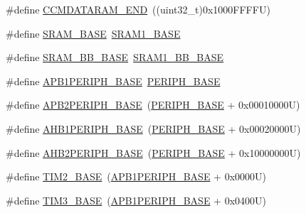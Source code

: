 \begin{DoxyCompactItemize}
\#define \hyperlink{group___peripheral__registers__structures_ga9fbe263946209e6f09faf93512bd2f9a}{C\+C\+M\+D\+A\+T\+A\+R\+A\+M\+\_\+\+E\+ND}~((uint32\+\_\+t)0x1000\+F\+F\+F\+F\+U)
\item 
\#define \hyperlink{group___peripheral__registers__structures_ga05e8f3d2e5868754a7cd88614955aecc}{S\+R\+A\+M\+\_\+\+B\+A\+SE}~\hyperlink{group___peripheral__memory__map_ga7d0fbfb8894012dbbb96754b95e562cd}{S\+R\+A\+M1\+\_\+\+B\+A\+SE}
\item 
\#define \hyperlink{group___peripheral__registers__structures_gad3548b6e2f017f39d399358f3ac98454}{S\+R\+A\+M\+\_\+\+B\+B\+\_\+\+B\+A\+SE}~\hyperlink{group___peripheral__memory__map_gac4c4f61082e4b168f29d9cf97dc3ca5c}{S\+R\+A\+M1\+\_\+\+B\+B\+\_\+\+B\+A\+SE}
\item 
\#define \hyperlink{group___peripheral__registers__structures_ga45666d911f39addd4c8c0a0ac3388cfb}{A\+P\+B1\+P\+E\+R\+I\+P\+H\+\_\+\+B\+A\+SE}~\hyperlink{group___peripheral__memory__map_ga9171f49478fa86d932f89e78e73b88b0}{P\+E\+R\+I\+P\+H\+\_\+\+B\+A\+SE}
\item 
\#define \hyperlink{group___peripheral__registers__structures_ga25b99d6065f1c8f751e78f43ade652cb}{A\+P\+B2\+P\+E\+R\+I\+P\+H\+\_\+\+B\+A\+SE}~(\hyperlink{group___peripheral__memory__map_ga9171f49478fa86d932f89e78e73b88b0}{P\+E\+R\+I\+P\+H\+\_\+\+B\+A\+SE} + 0x00010000\+U)
\item 
\#define \hyperlink{group___peripheral__registers__structures_ga811a9a4ca17f0a50354a9169541d56c4}{A\+H\+B1\+P\+E\+R\+I\+P\+H\+\_\+\+B\+A\+SE}~(\hyperlink{group___peripheral__memory__map_ga9171f49478fa86d932f89e78e73b88b0}{P\+E\+R\+I\+P\+H\+\_\+\+B\+A\+SE} + 0x00020000\+U)
\item 
\#define \hyperlink{group___peripheral__registers__structures_gaeedaa71d22a1948492365e2cd26cfd46}{A\+H\+B2\+P\+E\+R\+I\+P\+H\+\_\+\+B\+A\+SE}~(\hyperlink{group___peripheral__memory__map_ga9171f49478fa86d932f89e78e73b88b0}{P\+E\+R\+I\+P\+H\+\_\+\+B\+A\+SE} + 0x10000000\+U)
\item 
\#define \hyperlink{group___peripheral__registers__structures_ga00d0fe6ad532ab32f0f81cafca8d3aa5}{T\+I\+M2\+\_\+\+B\+A\+SE}~(\hyperlink{group___peripheral__memory__map_ga45666d911f39addd4c8c0a0ac3388cfb}{A\+P\+B1\+P\+E\+R\+I\+P\+H\+\_\+\+B\+A\+SE} + 0x0000\+U)
\item 
\#define \hyperlink{group___peripheral__registers__structures_gaf0c34a518f87e1e505cd2332e989564a}{T\+I\+M3\+\_\+\+B\+A\+SE}~(\hyperlink{group___peripheral__memory__map_ga45666d911f39addd4c8c0a0ac3388cfb}{A\+P\+B1\+P\+E\+R\+I\+P\+H\+\_\+\+B\+A\+SE} + 0x0400\+U)

\end{DoxyCompactItemize}
